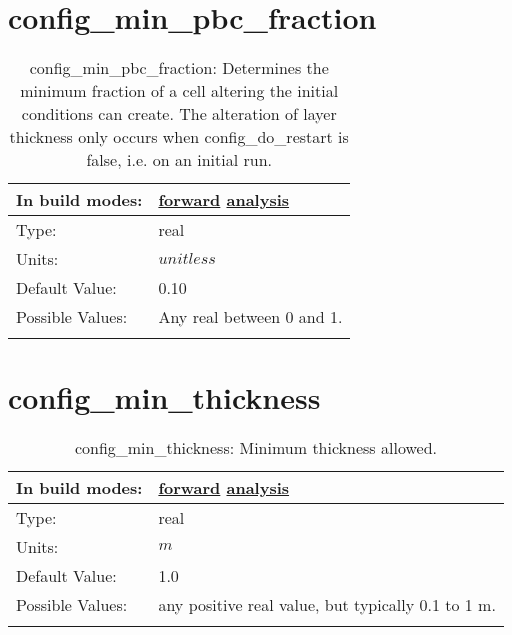 \section[config\_min\_pbc\_fraction]{config\_min\_pbc\_fraction}
\label{sec:nm_sec_config_min_pbc_fraction}
\begin{center}
\begin{longtable}{| p{2.0in} || p{4.0in} |}
    \hline
    In build modes: & \hyperref[subsec:forward_nm_tab_partial_bottom_cells]{forward} \hyperref[subsec:analysis_nm_tab_partial_bottom_cells]{analysis} \\
    \hline
    Type: & real \\
    \hline
    Units: & $unitless$ \\
    \hline
    Default Value: & 0.10 \\
    \hline
    Possible Values: & Any real between 0 and 1. \\
    \hline
    \caption{config\_min\_pbc\_fraction: Determines the minimum fraction of a cell altering the initial conditions can create. The alteration of layer thickness only occurs when config\_do\_restart is false, i.e. on an initial run.}
\end{longtable}
\end{center}
\section[config\_min\_thickness]{config\_min\_thickness}
\label{sec:nm_sec_config_min_thickness}
\begin{center}
\begin{longtable}{| p{2.0in} || p{4.0in} |}
    \hline
    In build modes: & \hyperref[subsec:forward_nm_tab_ALE_vertical_grid]{forward} \hyperref[subsec:analysis_nm_tab_ALE_vertical_grid]{analysis} \\
    \hline
    Type: & real \\
    \hline
    Units: & $m$ \\
    \hline
    Default Value: & 1.0 \\
    \hline
    Possible Values: & any positive real value, but typically 0.1 to 1 m. \\
    \hline
    \caption{config\_min\_thickness: Minimum thickness allowed.}
\end{longtable}
\end{center}
